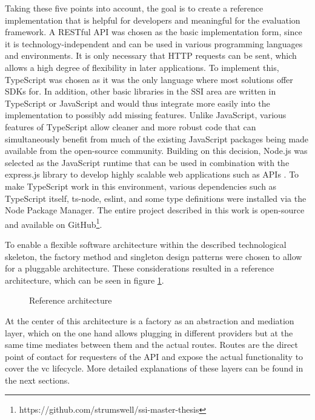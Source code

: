     Taking these five points into account, the goal is to create a reference implementation that is helpful for developers and meaningful for the evaluation framework. A RESTful API was chosen as the basic implementation form, since it is technology-independent and can be used in various programming languages and environments. It is only necessary that HTTP requests can be sent, which allows a high degree of flexibility in later applications. To implement this, TypeScript was chosen as it was the only language where most solutions offer SDKs for. In addition, other basic libraries in the \ac{SSI} area are written in TypeScript or JavaScript and would thus integrate more easily into the implementation to possibly add missing features. Unlike JavaScript, various features of TypeScript allow cleaner and more robust code \cite[p. 87]{zammetti_modern_2020} that can simultaneously benefit from much of the existing JavaScript packages being made available from the open-source community. Building on this decision, Node.js was selected as the JavaScript runtime that can be used in combination with the express.js library to develop highly scalable web applications such as APIs \cite{openjs_foundation_about_2021, openjs_foundation_express_2021}. To make TypeScript work in this environment, various dependencies such as TypeScript itself, ts-node, eslint, and some type definitions were installed via the Node Package Manager. The entire project described in this work is open-source and available on GitHub\footnote{https://github.com/strumswell/ssi-master-thesis}.
    
    To enable a flexible software architecture within the described technological skeleton, the factory method and singleton design patterns were chosen to allow for a pluggable architecture. These considerations resulted in a reference architecture, which can be seen in figure \ref{figure: ref arch}.
    
    \begin{figure}[ht]
	    \centering    	    
	    \makebox[\textwidth]{}
        \caption{Reference architecture}
        \label{figure: ref arch}
    \end{figure}
    
    At the center of this architecture is a factory as an abstraction and mediation layer, which on the one hand allows plugging in different providers but at the same time mediates between them and the actual routes. Routes are the direct point of contact for requesters of the API and expose the actual functionality to cover the \ac{vc} lifecycle. More detailed explanations of these layers can be found in the next sections.


